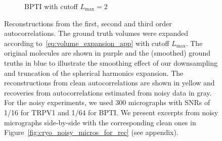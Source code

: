 \documentclass[12pt]{article}
\newcommand{\1}{\mathbf{1}}
\theoremstyle{plain}
\theoremstyle{definition}
\theoremstyle{remark}
\theoremstyle{plain}
\theoremstyle{remark}
\theoremstyle{plain}
\theoremstyle{plain}
\begin{document}
\begin{figure}[h]
\begin{subfigure}[h]{0.45\textwidth}
		\caption{BPTI with cutoff $L_{\text{max}}=2$}\label{fig:BPTI_recon}
	\end{subfigure} 
	\caption{\label{fig:cryo_recon} Reconstructions from the first, second and third order autocorrelations.
		The ground truth volumes were expanded according to~\eqref{eq:volume_expansion_app} with cutoff $L_{\text{max}}$.
		{The original molecules are shown in purple and the (smoothed) ground truths in blue  to illustrate the smoothing effect of our downsampling and truncation of the spherical harmonics expansion.
			The reconstructions  from clean autocorrelations are shown in yellow and recoveries from 
			autocorrelations estimated from noisy data in gray. For the noisy experiments, we used 300 micrographs with SNRs of 1/16 for TRPV1 and 1/64 for BPTI. We present excerpts from noisy micrographs side-by-side with the corresponding clean ones in Figure~\ref{fig:cryo_noisy_micros_for_rec} (see appendix)}.}
\end{figure}
\end{document}
